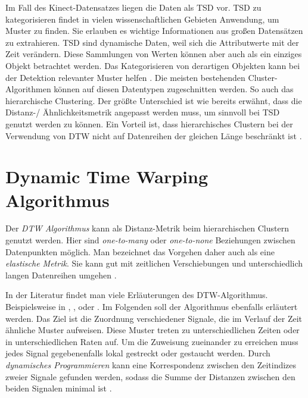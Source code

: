 Im Fall des Kinect-Datensatzes liegen die Daten als \ac{TSD} vor.
\ac{TSD} zu kategorisieren findet in vielen wissenschaftlichen Gebieten Anwendung, um Muster zu finden.
Sie erlauben es wichtige Informationen aus großen Datensätzen zu extrahieren.
\ac{TSD} sind dynamische Daten, weil sich die Attributwerte mit der Zeit verändern.
Diese Sammlungen von Werten können aber auch als ein einziges Objekt betrachtet werden.
Das Kategorisieren von derartigen Objekten kann bei der Detektion relevanter Muster helfen \citep{aghabozorgi_time-series_2015}.
Die meisten bestehenden Cluster-Algorithmen können auf diesen Datentypen zugeschnitten werden.
So auch das hierarchische Clustering.
Der größte Unterschied ist wie bereits erwähnt, dass die Distanz-/ Ähnlichkeitsmetrik angepasst werden muss,
um sinnvoll bei \ac{TSD} genutzt werden zu können.
Ein Vorteil ist, dass hierarchisches Clustern bei der Verwendung von \ac{DTW}
nicht auf Datenreihen der gleichen Länge beschränkt ist \citep{warren_liao_clustering_2005}.


\section{Dynamic Time Warping Algorithmus}
\label{chapter2-DTW}
Der \emph{\ac{DTW} Algorithmus} kann als Distanz-Metrik beim hierarchischen Clustern genutzt werden.
Hier sind \emph{one-to-many} oder \emph{one-to-none} Beziehungen zwischen Datenpunkten möglich.
Man bezeichnet das Vorgehen daher auch als eine \emph{elastische Metrik}.
Sie kann gut mit zeitlichen Verschiebungen und unterschiedlich langen Datenreihen umgehen \citep{aghabozorgi_time-series_2015}.

In der Literatur findet man viele Erläuterungen des \ac{DTW}-Algorithmus.
Beispielsweise in \citet{mohammadzade_dynamic_2021}, \citet{warren_liao_clustering_2005},
\citet{aghabozorgi_time-series_2015} oder \citet{yu_dynamic_2019}.
Im Folgenden soll der Algorithmus ebenfalls erläutert werden.
Das Ziel ist die Zuordnung verschiedener Signale,
die im Verlauf der Zeit ähnliche Muster aufweisen.
Diese Muster treten zu unterschiedlichen Zeiten oder in unterschiedlichen Raten auf.
Um die Zuweisung zueinander zu erreichen muss jedes Signal gegebenenfalls lokal gestreckt oder gestaucht werden.
Durch \emph{dynamisches Programmieren} kann eine Korrespondenz zwischen den Zeitindizes zweier Signale gefunden werden,
sodass die Summe der Distanzen zwischen den beiden Signalen minimal ist \citep{mohammadzade_dynamic_2021}.

